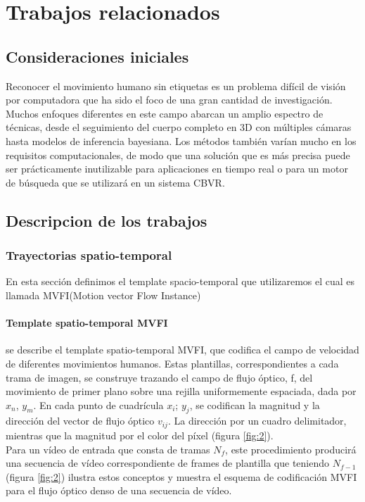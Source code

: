 \chapter{Trabajos relacionados}


\section{Consideraciones iniciales}
Reconocer el movimiento humano sin etiquetas es un problema difícil de visión por computadora que ha sido el foco de una gran cantidad de investigación. Muchos enfoques diferentes en este campo abarcan un amplio espectro de técnicas, desde el seguimiento del cuerpo completo en 3D con múltiples cámaras hasta modelos de inferencia bayesiana. Los métodos también varían mucho en los requisitos computacionales, de modo que una solución que es más precisa puede ser prácticamente inutilizable para aplicaciones en tiempo real o para un motor de búsqueda que se utilizará en un sistema CBVR.

\section{Descripcion de los trabajos}

\subsection{Trayectorias spatio-temporal}
En esta sección definimos el template spacio-temporal que utilizaremos el cual es llamada MVFI(Motion vector Flow Instance) 
\subsubsection{Template spatio-temporal  MVFI}
se describe el template spatio-temporal MVFI, que codifica el campo de velocidad de diferentes movimientos humanos. Estas plantillas, correspondientes a cada trama de imagen, se construye trazando el campo de flujo óptico, f, del movimiento de primer plano sobre una rejilla uniformemente espaciada, dada por $x_n$, $y_m$. En cada punto de cuadrícula $x_i$; $y_j$, se codifican la magnitud y la dirección del vector de flujo óptico $v_{ij}$. La dirección por un cuadro delimitador, mientras que la magnitud por el color del píxel (figura \ref{fig:2}). \\
Para un vídeo de entrada que consta de tramas $N_f$, este procedimiento producirá una secuencia de vídeo correspondiente de frames de plantilla que teniendo $N_{f-1}$ (figura \ref{fig:2}) ilustra estos conceptos y muestra el esquema de codificación MVFI para el flujo óptico denso de una secuencia de vídeo.
 
